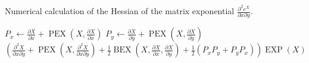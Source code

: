 \begin{algorithm}[!ht]
	\caption[Hessian of $e^X$]{Numerical calculation of the Hessian of the matrix exponential $\frac{\partial^2 e^X}{\partial x \partial y}$.}
	\label{alg:hessian}
	\begin{algorithmic}[1]
			\State $P_x \gets \frac{\partial X}{\partial x} + \operatorname{PEX}\left(X,\frac{\partial X}{\partial x}\right)$
			\State $P_y \gets \frac{\partial X}{\partial y} + \operatorname{PEX}\left(X,\frac{\partial X}{\partial y}\right)$
			\State \Return $\left(\frac{\partial^2 X}{\partial x \partial y} + \operatorname{PEX}\left(X,\frac{\partial^2 X}{\partial x \partial y}\right) + \frac{1}{2} \operatorname{BEX}\left(X,\frac{\partial X}{\partial x},\frac{\partial X}{\partial y}\right) +  \frac{1}{2}\left(P_x P_y + P_y P_x\right)\right) \operatorname{EXP}\left(X\right)$
		\EndFunction
	\end{algorithmic}
\end{algorithm}